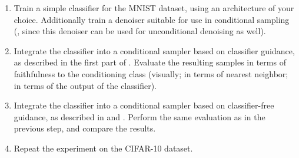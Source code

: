 \documentclass[../../book-main.tex]{subfiles}
\begin{document}
\begin{exercise}
  \begin{enumerate}
    \item Train a simple classifier for the MNIST dataset, using an architecture
      of your choice. Additionally train a denoiser suitable for use in
      conditional sampling (,
      since this denoiser can be used for unconditional denoising as well).
    \item Integrate the classifier into a conditional sampler based on
      classifier guidance, as described in the first part of .
      Evaluate the resulting samples in terms of faithfulness to the
      conditioning class (visually; in terms of nearest neighbor; in terms of
      the output of the classifier).
    \item Integrate the classifier into a conditional sampler based on
      classifier-free guidance, as described in  and
      . Perform the same
      evaluation as in the previous step, and compare the results.
    \item Repeat the experiment on the CIFAR-10 dataset.
  \end{enumerate}


\end{exercise}
\end{document}
